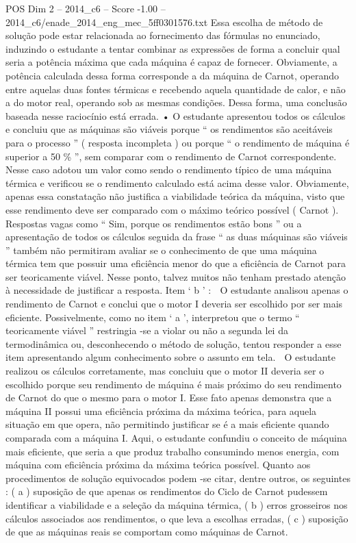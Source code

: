 \begin{textsample}{POS Dim 2 – 2014\_c6 – Score -1.00 – 2014\_c6/enade\_2014\_eng\_mec\_5ff0301576.txt}
Essa escolha de método de solução pode estar relacionada ao fornecimento das fórmulas no enunciado, induzindo o estudante a tentar combinar as expressões de forma a concluir qual seria a potência máxima que cada máquina é capaz de fornecer.
Obviamente, a potência calculada dessa forma corresponde a da máquina de Carnot, operando entre aquelas duas fontes térmicas e recebendo aquela quantidade de calor, e não a do motor real, operando sob as mesmas condições.
Dessa forma, uma conclusão baseada nesse raciocínio está errada. • O estudante apresentou todos os cálculos e concluiu que as máquinas são viáveis porque “ os rendimentos são aceitáveis para o processo ” ( resposta incompleta ) ou porque “ o rendimento de máquina é superior a 50 \% ”, sem comparar com o rendimento de Carnot correspondente.
Nesse caso adotou um valor como sendo o rendimento típico de uma máquina térmica e verificou se o rendimento calculado está acima desse valor.
Obviamente, apenas essa constatação não justifica a viabilidade teórica da máquina, visto que esse rendimento deve ser comparado com o máximo teórico possível ( Carnot ).  Respostas vagas como “ Sim, porque os rendimentos estão bons ” ou a apresentação de todos os cálculos seguida da frase “ as duas máquinas são viáveis ” também não permitiram avaliar se o conhecimento de que uma máquina térmica tem que possuir uma eficiência menor do que a eficiência de Carnot para ser teoricamente viável.
Nesse ponto, talvez muitos não tenham prestado atenção à necessidade de justificar a resposta.
Item ‘ b ’ :  O estudante analisou apenas o rendimento de Carnot e conclui que o motor I deveria ser escolhido por ser mais eficiente.
Possivelmente, como no item ‘ a ’, interpretou que o termo “ teoricamente viável ” restringia -se a violar ou não a segunda lei da termodinâmica ou, desconhecendo o método de solução, tentou responder a esse item apresentando algum conhecimento sobre o assunto em tela.  O estudante realizou os cálculos corretamente, mas concluiu que o motor II deveria ser o escolhido porque seu rendimento de máquina é mais próximo do seu rendimento de Carnot do que o mesmo para o motor I.
Esse fato apenas demonstra que a máquina II possui uma eficiência próxima da máxima teórica, para aquela situação em que opera, não permitindo justificar se é a mais eficiente quando comparada com a máquina I.
Aqui, o estudante confundiu o conceito de máquina mais eficiente, que seria a que produz trabalho consumindo menos energia, com máquina com eficiência próxima da máxima teórica possível.
Quanto aos procedimentos de solução equivocados podem -se citar, dentre outros, os seguintes : ( a ) suposição de que apenas os rendimentos do Ciclo de Carnot pudessem identificar a viabilidade e a seleção da máquina térmica, ( b ) erros grosseiros nos cálculos associados aos rendimentos, o que leva a escolhas erradas, ( c ) suposição de que as máquinas reais se comportam como máquinas de Carnot.

\end{textsample}
